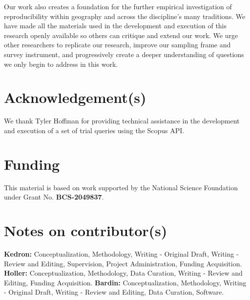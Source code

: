 \documentclass[]{interact}
\theoremstyle{plain}%
\theoremstyle{definition}
\theoremstyle{remark}
\begin{document}
Our work also creates a foundation for the further empirical investigation of reproducibility within geography and across the discipline's many traditions. 
We have made all the materials used in the development and execution of this research openly available so others can critique and extend our work.
We urge other researchers to replicate our research, improve our sampling frame and survey instrument, and progressively create a deeper understanding of questions we only begin to address in this work. 


\theendnotes


\section*{Acknowledgement(s)}
We thank Tyler Hoffman for providing technical assistance in the development and execution of a set of trial queries using the Scopus API.

\section*{Funding}
This material is based on work supported by the National Science Foundation under Grant No. \textbf{BCS-2049837}.

\section*{Notes on contributor(s)}
\textbf{Kedron:} Conceptualization, Methodology, Writing - Original Draft, Writing - Review and Editing, Supervision, Project Administration, Funding Acquisition. \textbf{Holler:} Conceptualization, Methodology, Data Curation, Writing - Review and Editing, Funding Acquisition. \textbf{Bardin:} Conceptualization, Methodology, Writing - Original Draft, Writing - Review and Editing, Data Curation, Software.
\end{document}
